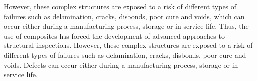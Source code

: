 However, these complex structures are exposed to a risk of different types of failures such as delamination, cracks, disbonds, poor cure and voids, which can occur either during a manufacturing process, storage or in-service life.
Thus, the use of composites has forced the development of advanced approaches to structural inspections. 
 However, these complex structures are exposed to a risk of different types of failures such as delamination, cracks, disbonds, poor cure and voids. Defects can occur either during a manufacturing process, storage or in--service life.
